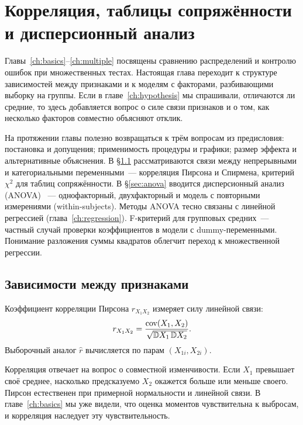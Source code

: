 \chapter{Корреляция, таблицы сопряжённости и дисперсионный анализ}
\label{ch:anova}

Главы~\ref{ch:basics}--\ref{ch:multiple} посвящены сравнению распределений и контролю ошибок при множественных тестах.
Настоящая глава переходит к структуре зависимостей между признаками и к моделям с факторами, разбивающими выборку на группы.
Если в главе~\ref{ch:hypothesis} мы спрашивали, отличаются ли средние, то здесь добавляется вопрос о силе связи признаков и о том, как несколько факторов совместно объясняют отклик.


На протяжении главы полезно возвращаться к трём вопросам из предисловия: постановка и допущения; применимость процедуры и графики; размер эффекта и альтернативные объяснения. 
В \S\ref{sec:dependencies} рассматриваются связи между непрерывными и категориальными переменными~--- корреляция Пирсона и Спирмена, критерий $\chi^2$ для таблиц сопряжённости.
В \S\ref{sec:anova} вводится дисперсионный анализ (ANOVA) \citep{fisher1925}~--- однофакторный, двухфакторный и модель с повторными измерениями (within-subjects).
Методы ANOVA тесно связаны с линейной регрессией (глава~\ref{ch:regression}). F-критерий для групповых средних~--- частный случай проверки коэффициентов в модели с dummy-переменными. Понимание разложения суммы квадратов облегчит переход к множественной регрессии.

\section{Зависимости между признаками}
\label{sec:dependencies}

\begin{definition}
Коэффициент корреляции Пирсона $r_{X_1X_2}$ измеряет силу линейной связи: \[ r_{X_1X_2}=\frac{\operatorname{cov}(X_1,X_2)}{\sqrt{\mathbb DX_1\,\mathbb DX_2}}.
\] Выборочный аналог $\hat r$ вычисляется по парам $(X_{1i},X_{2i})$.
\end{definition}

Корреляция отвечает на вопрос о совместной изменчивости. Если $X_1$ превышает своё среднее, насколько предсказуемо $X_2$ окажется больше или меньше своего.
Пирсон естественен при примерной нормальности и линейной связи. В главе~\ref{ch:basics} мы уже видели, что оценка моментов чувствительна к выбросам, и корреляция наследует эту чувствительность.

